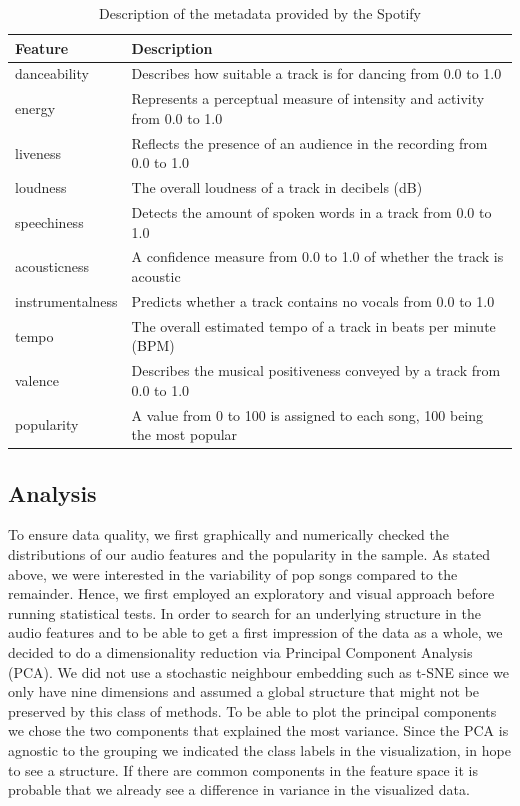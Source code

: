 \documentclass{article}
\begin{document}
\begin{table}[t]
  \centering
  \begin{tabular}{ll}
    \toprule
    Feature     & Description\\
    \midrule
	danceability        	& Describes how suitable a track is for dancing from 0.0 to 1.0  \\
	energy              	&  Represents a perceptual measure of intensity and activity from 0.0 to 1.0\\
	liveness            	&  Reflects the presence of an audience in the recording from 0.0 to 1.0\\
	loudness            	&  The overall loudness of a track in decibels (dB)\\
	speechiness         	&  Detects the amount of spoken words in a track from 0.0 to 1.0\\
	acousticness        	& A confidence measure from 0.0 to 1.0 of whether the track is acoustic	\\
	instrumentalness    	& Predicts whether a track contains no vocals  from 0.0 to 1.0 \\
	tempo               	&  The overall estimated tempo of a track in beats per minute (BPM)\\
	valence             	& Describes the musical positiveness conveyed by a track from 0.0 to 1.0\\
	\midrule
	popularity           &  A value from 0 to 100 is assigned to each song, 100 being the most popular\\
    \bottomrule
  \end{tabular}
  \vspace*{2mm}
  \caption{Description of the metadata provided by the Spotify}
  \label{tab:features}
\end{table}


\subsection{Analysis}
To ensure data quality, we first graphically and numerically checked the distributions of our audio features and the popularity in the sample.
As stated above, we were interested in the variability of pop songs compared to the remainder. Hence, we first employed an exploratory and visual approach before running statistical tests. In order to search for an underlying structure in the audio features and to be able to get a first impression of the data as a whole, we decided to do a dimensionality reduction via Principal Component Analysis (PCA). We did not use a stochastic neighbour embedding such as t-SNE since we only have nine dimensions and assumed a global structure that might not be preserved by this class of methods. To be able to plot the principal components we chose the two components that explained the most variance. Since the PCA is agnostic to the grouping we indicated the class labels in the visualization, in hope to see a structure. If there are common components in the feature space it is probable that we already see a difference in variance in the visualized data.
\end{document}
